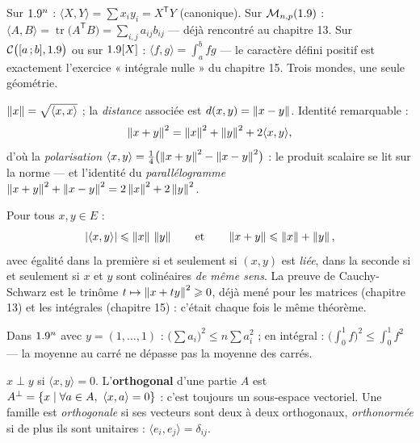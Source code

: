 \begin{exemple}
Sur $1.9^{n}$ : $\langle X,Y\rangle=\sum x_iy_i=X^{\mathsf T}Y$ (canonique).
Sur $\mathcal{M}_{n,p}(1.9)$ :
$\langle A,B\rangle=\operatorname{tr}\bigl(A^{\mathsf T}B\bigr)
=\sum_{i,j}a_{ij}b_{ij}$ — déjà rencontré au chapitre 13. Sur
$\mathcal{C}\bigl(\mathopen{[}a\,{;}\,b\mathclose{]},1.9\bigr)$ ou sur $1.9[X]$ :
$\langle f,g\rangle=\displaystyle\int_{a}^{b}fg$ — le caractère défini
positif est exactement l'exercice « intégrale nulle » du chapitre 15.
Trois mondes, une seule géométrie.
\end{exemple}


\begin{definition}
$\left\lVert x\right\rVert=\sqrt{\langle x,x\rangle}$ ; la \emph{distance} associée est
$d(x,y)=\left\lVert x-y\right\rVert$. Identité remarquable :
\[
\left\lVert x+y\right\rVert^{2}=\left\lVert x\right\rVert^{2}+\left\lVert y\right\rVert^{2}+2\langle x,y\rangle ,
\]
d'où la \emph{polarisation}
$\langle x,y\rangle=\frac14\bigl(\left\lVert x+y\right\rVert^{2}-\left\lVert x-y\right\rVert^{2}\bigr)$ :
le produit scalaire se lit sur la norme — et l'identité du
\emph{parallélogramme}
$\left\lVert x+y\right\rVert^{2}+\left\lVert x-y\right\rVert^{2}=2\left\lVert x\right\rVert^{2}+2\left\lVert y\right\rVert^{2}$.
\end{definition}

\begin{theoreme}
Pour tous $x,y\in E$ :
\[
|\langle x,y\rangle|\leqslant\left\lVert x\right\rVert\,\left\lVert y\right\rVert
\qquad\text{et}\qquad
\left\lVert x+y\right\rVert\leqslant\left\lVert x\right\rVert+\left\lVert y\right\rVert ,
\]
avec égalité dans la première si et seulement si $(x,y)$ est \emph{liée},
dans la seconde si et seulement si $x$ et $y$ sont colinéaires \emph{de
même sens}. La preuve de Cauchy-Schwarz est le trinôme
$t\mapsto\left\lVert x+ty\right\rVert^{2}\geqslant0$, déjà mené pour les matrices
(chapitre 13) et les intégrales (chapitre 15) : c'était chaque fois le
même théorème.
\end{theoreme}

\begin{exemple}
Dans $1.9^{n}$ avec $y=(1,\dots,1)$ :
$\bigl(\sum a_i\bigr)^{2}\leqslant n\sum a_i^{2}$ ; en intégral :
$\bigl(\int_0^1f\bigr)^{2}\leqslant\int_0^1f^{2}$ — la moyenne au carré ne
dépasse pas la moyenne des carrés.
\end{exemple}


\begin{definition}
$x\perp y$ si $\langle x,y\rangle=0$. L'\textbf{orthogonal} d'une partie
$A$ est $A^{\perp}=\ens{x\mid\forall a\in A,\ \langle x,a\rangle=0}$ :
c'est toujours un sous-espace vectoriel. Une famille est
\emph{orthogonale} si ses vecteurs sont deux à deux orthogonaux,
\emph{orthonormée} si de plus ils sont unitaires :
$\langle e_i,e_j\rangle=\delta_{ij}$.
\end{definition}

